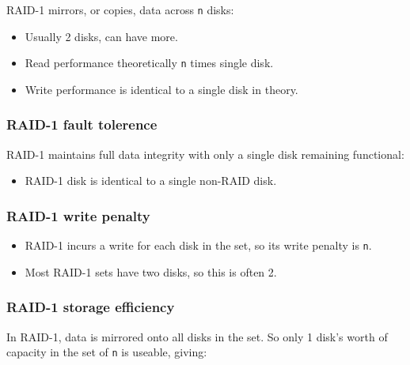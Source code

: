 \documentclass[slides]{pgnotes}
\begin{document}
\begin{minipage}{0.6\linewidth}
  RAID-1 mirrors, or copies, data across \texttt{n} disks:
  \begin{itemize}
  \item
    Usually 2 disks, can have more.
  \item
    Read performance theoretically \texttt{n} times single disk.
  \item
    Write performance is identical to a single disk in theory.
  \end{itemize}
\subsubsection{RAID-1 fault tolerence}
\label{sec:raid-1-fault-tolerence}

RAID-1 maintains full data integrity with only a single disk remaining
functional:

\begin{itemize}

\item
  RAID-1 disk is identical to a single non-RAID disk.
\end{itemize}


\end{minipage}
\begin{minipage}{0.39\linewidth}
\end{minipage}

\subsubsection{RAID-1 write penalty}
\label{sec:raid-1-write-penalty}

\begin{itemize}
\item RAID-1 incurs a write for each disk in the set, so its write penalty is
  \texttt{n}.
\item Most RAID-1 sets have two disks, so this is often 2.
\end{itemize}

\newpage
\subsubsection{RAID-1 storage efficiency}
\label{sec:raid-1-storage-efficiency}

In RAID-1, data is mirrored onto all disks in the set. So only 1 disk's
worth of capacity in the set of \texttt{n} is useable, giving:
\end{document}
